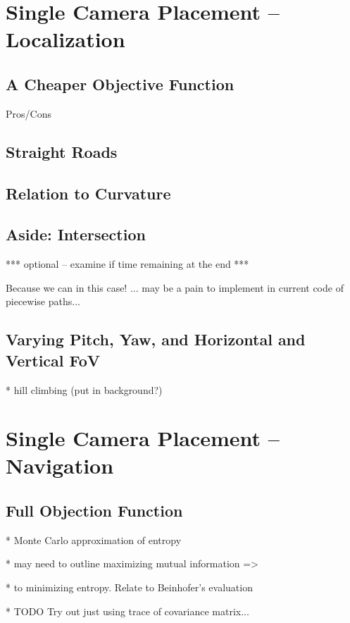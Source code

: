\documentclass[a4paper,12pt,twoside,openright]{report}
\begin{document}
\section{Single Camera Placement -- Localization}

\subsection{A Cheaper Objective Function}
Pros/Cons

\subsection{Straight Roads}

\subsection{Relation to Curvature}

\subsection{Aside: Intersection}

*** optional -- examine if time remaining at the end ***

Because we can in this case! ... may be a pain to implement in current code of piecewise paths...

\subsection{Varying Pitch, Yaw, and Horizontal and Vertical FoV}

* hill climbing (put in background?)


\section{Single Camera Placement -- Navigation}

\subsection{Full Objection Function}
* Monte Carlo approximation of entropy

* may need to outline maximizing mutual information =>

* to minimizing entropy. Relate to Beinhofer's evaluation

* TODO Try out just using trace of covariance matrix...
\end{document}
